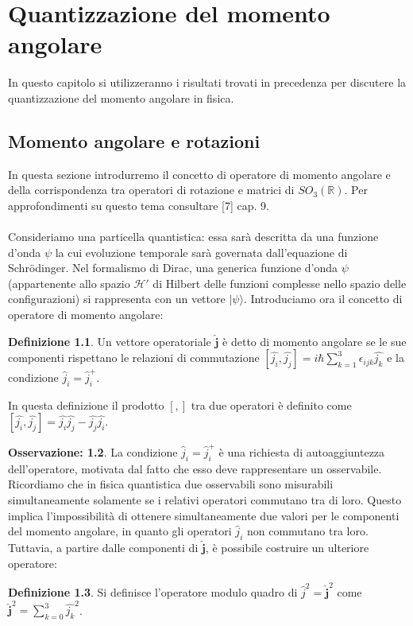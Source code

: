 \documentclass[12pt,a4paper]{report}
\theoremstyle{definition}
\newtheorem{Def}{Definizione}[chapter]
\theoremstyle{Theorem}
\theoremstyle{definition}
\theoremstyle{definition}
\theoremstyle{definition}
\newtheorem{Obs}[Def]{Osservazione:}
\begin{document}
\chapter{Quantizzazione del momento angolare}
In questo capitolo si utilizzeranno i risultati trovati in precedenza per discutere la quantizzazione del momento angolare in fisica.
\section{Momento angolare e rotazioni}
In questa sezione introdurremo il concetto di operatore di momento angolare e della corrispondenza tra operatori di rotazione e matrici di $SO_3(\mathbb{R})$. Per approfondimenti su questo tema consultare [7] cap. 9. \\\\
Consideriamo una particella quantistica: essa sarà descritta da una funzione d'onda $\psi$ la cui evoluzione temporale sarà governata dall'equazione di Schrödinger. Nel formalismo di Dirac, una generica funzione d'onda $\psi$ (appartenente allo spazio $\mathcal{H'}$ di Hilbert delle funzioni complesse nello spazio delle configurazioni) si rappresenta con un vettore $|\psi\rangle$. Introduciamo ora il concetto di operatore di momento angolare:
\begin{Def}
	Un vettore operatoriale $\hat{\textbf{j}}$ è detto di momento angolare se le sue componenti rispettano le relazioni di commutazione $[\hat{j_i},\hat{j_j}]=i\hbar\sum_{k=1}^{3}\epsilon_{ijk}\hat{j_k}$ e la condizione $\hat{j}_i=\hat{j}^+_i$.
\end{Def} 
In questa definizione il prodotto $[,]$ tra due operatori è definito come $[\hat{j_i},\hat{j_j}]=\hat{j_i}\hat{j_j}-\hat{j_j}\hat{j_i}$.
\begin{Obs}
La condizione $\hat{j}_i=\hat{j}^+_i$ è una richiesta di autoaggiuntezza dell'operatore, motivata dal fatto che esso deve rappresentare un osservabile. Ricordiamo che in fisica quantistica due osservabili sono misurabili simultaneamente solamente se i relativi operatori commutano tra di loro. Questo implica l'impossibilità di ottenere simultaneamente due valori per le componenti del momento angolare, in quanto gli operatori $\hat{j}_i$ non commutano tra loro. Tuttavia, a partire dalle componenti di $\hat{\textbf{j}}$, è possibile costruire un ulteriore operatore:
\end{Obs}
\begin{Def}
	Si definisce l'operatore modulo quadro di $\hat{j}^2=\hat{\textbf{j}}^2$ come $\hat{\textbf{j}}^2=\sum_{k=0}^{3}\hat{j_k}^2$.
\end{Def}
\end{document}
